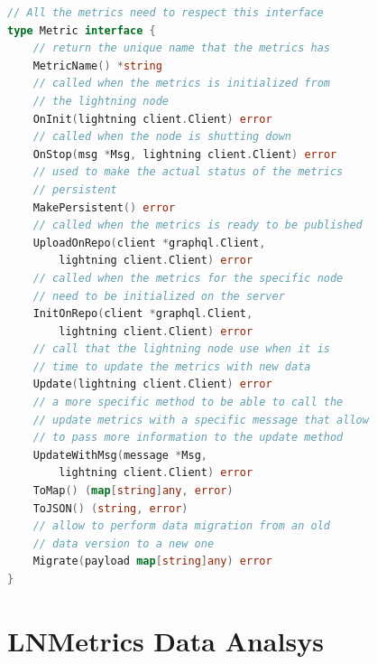 \begin{lstlisting}[language=go, basicstyle=\small,
                  caption={Metric interface provided in our client reference implementation.}, 
                  label={code:lnmetric_client_inter}]
// All the metrics need to respect this interface
type Metric interface {
    // return the unique name that the metrics has
	MetricName() *string
    // called when the metrics is initialized from 
    // the lightning node
    OnInit(lightning client.Client) error
    // called when the node is shutting down
    OnStop(msg *Msg, lightning client.Client) error
    // used to make the actual status of the metrics
    // persistent
    MakePersistent() error
    // called when the metrics is ready to be published
    UploadOnRepo(client *graphql.Client, 
        lightning client.Client) error
    // called when the metrics for the specific node 
    // need to be initialized on the server
    InitOnRepo(client *graphql.Client, 
        lightning client.Client) error
    // call that the lightning node use when it is 
    // time to update the metrics with new data
    Update(lightning client.Client) error
    // a more specific method to be able to call the 
    // update metrics with a specific message that allow 
    // to pass more information to the update method
    UpdateWithMsg(message *Msg, 
        lightning client.Client) error
    ToMap() (map[string]any, error)
    ToJSON() (string, error)
    // allow to perform data migration from an old 
    // data version to a new one
    Migrate(payload map[string]any) error
}
\end{lstlisting}

\section{LNMetrics Data Analsys}
\label{sec:lnmetrics_server}
